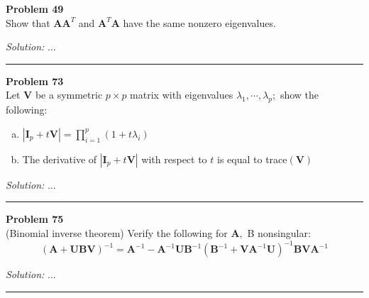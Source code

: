 \documentclass[a4paper, 11pt]{article}
\newenvironment{problem}[2][Problem]
    { \begin{mdframed}[backgroundcolor=gray!20] \textbf{#1 #2} \\}
    {  \end{mdframed}}
\newenvironment{solution}
    {\textit{Solution:}}
    {}
\begin{document}
\begin{problem}{49}
 Show that $\mathbf{A}\mathbf{A}^{T}$ and $\mathbf{A}^{T}\mathbf{A}$  have the same nonzero eigenvalues.
\end{problem}
\begin{solution}
...
\end{solution}
\noindent\rule{7in}{2.8pt}


\begin{problem}{73}
  Let $\mathbf{V}$ be a symmetric $p \times p$ matrix with eigenvalues $\lambda_{1}, \cdots, \lambda_{p} ;$ show the following:
  \begin{enumerate}[a.]
    \item $\left|\mathbf{I}_{p}+t \mathbf{V}\right|=\prod_{i=1}^{p}\left(1+t \lambda_{i}\right)$
    \item The derivative of $\left|\mathbf{I}_{p}+t \mathbf{V}\right|$ with respect to $t$ is equal to trace$(\mathbf{V})$
  \end{enumerate}
\end{problem}
\begin{solution}
...
\end{solution}
\noindent\rule{7in}{2.8pt}


\begin{problem}{75}
  (Binomial inverse theorem) Verify the following for $\mathbf{A},$ B nonsingular:
  $$
  (\mathbf{A}+\mathbf{U B V})^{-1}=\mathbf{A}^{-1}-\mathbf{A}^{-1} \mathbf{U B}^{-1}\left(\mathbf{B}^{-1}+\mathbf{V A}^{-1} \mathbf{U}\right)^{-1} \mathbf{B V A}^{-1}
  $$
\end{problem}
\begin{solution}
...
\end{solution}
\noindent\rule{7in}{2.8pt}

% 
\end{document}

